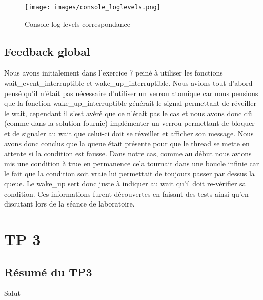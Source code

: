 \documentclass{ReportTemplate}
\begin{document}
\begin{figure}[H]
    \centering
    \texttt{[image: images/console\_loglevels.png]}
    \caption{Console log levels correspondance}
    \label{fig:LogLevels}
\end{figure}
\newpage
\section{Feedback global}
Nous avons initialement dans l'exercice 7 peiné à utiliser les fonctions
wait\_event\_interruptible et wake\_up\_interruptible. Nous avions tout d'abord
pensé qu'il n'était pas nécessaire d'utiliser un verrou atomique car nous
pensions que la fonction wake\_up\_interruptible générait le signal permettant
de réveiller le wait, cependant il s'est avéré que ce n'était pas le cas et nous
avons donc dû (comme dans la solution fournie) implémenter un verrou permettant
de bloquer et de signaler au wait que celui-ci doit se réveiller et afficher son
message. Nous avons donc conclus que la queue était présente pour que le thread
se mette en attente si la condition est fausse. Dans notre cas, comme au début
nous avions mis une condition à true en permanence cela tournait dans une boucle
infinie car le fait que la condition soit vraie lui permettait de toujours
passer par dessus la queue. Le wake\_up sert donc juste à indiquer au wait qu'il
doit re-vérifier sa condition. Ces informations furent découvertes en faisant
des tests ainsi qu'en discutant lors de la séance de laboratoire.\newline

\chapter{TP 3}
\section{Résumé du TP3}
Salut
\end{document}

